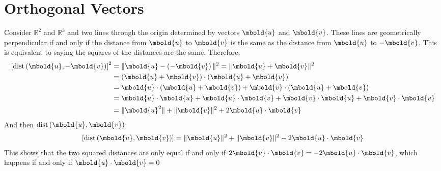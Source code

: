 \documentclass[12pt letter]{report}
\begin{document}
\section{Orthogonal Vectors}

Consider $\mathbb{R}^{2}$ and $\mathbb{R}^{3}$ and two lines through the origin determined by vectors $\mbold{u}$ and
$\mbold{v}$. These lines are geometrically perpendicular if and only if the distance from $\mbold{u}$ to $\mbold{v}$ is
the same as the distance from $\mbold{u}$ to $-\mbold{v}$. This is equivalent to saying the squares of the distances are
the same. Therefore:
\begin{align*}
  \left[ \text{dist} \left( \mbold{u}, -\mbold{v} \right)  \right] ^2 & = \|\mbold{u} - \left( -\mbold{v} \right) \|^2 =
  \|\mbold{u} + \mbold{v}\|^2                                                                                                                                                         \\
                                                                      & = \left( \mbold{u} + \mbold{v} \right) \cdot \left( \mbold{u} + \mbold{v} \right)                             \\
                                                                      & = \mbold{u} \cdot \left( \mbold{u} + \mbold{v} \right) + \mbold{v} \cdot \left( \mbold{u} + \mbold{v} \right) \\
                                                                      & = \mbold{u}\cdot \mbold{u} + \mbold{u} \cdot \mbold{v} + \mbold{v}\cdot \mbold{u} + \mbold{v}\cdot \mbold{v}  \\
                                                                      & = \|\mbold{u}^2\| + \|\mbold{v}\|^2 +
  2\mbold{u}\cdot \mbold{v}                                                                                                                                                           \\
\end{align*}
And then $\text{dist} \left( \mbold{u}, \mbold{v} \right) $:
\begin{align*}
  \left[ \text{dist} \left( \mbold{u}, \mbold{v} \right)  \right] & = \|\mbold{u}\|^2 + \|\mbold{v}\|^2 - 2\mbold{u}\cdot \mbold{v} \\
\end{align*}
This shows that the two squared distances are only equal if and only if $2\mbold{u}\cdot \mbold{v} = -2\mbold{u}\cdot
  \mbold{v}$, which happens if and only if $\mbold{u} \cdot \mbold{v} = 0$
\end{document}
